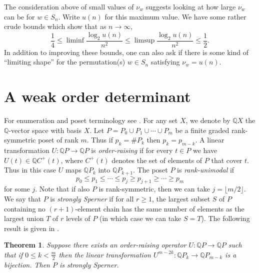 \documentclass[12pt]{amsart}
\newtheorem{thm}{Theorem}[section]
\theoremstyle{definition}
\theoremstyle{remark}
\numberwithin{equation}{section}
\begin{document}
The consideration above of small values of $\nu_w$ suggests looking at
how large $\nu_w$ can be for $w\in S_n$. Write $u(n)$ for this maximum
value. We have some rather crude bounds
which show that as $n\to\infty$,
 $$ \frac 14\leq\liminf \frac{\log_2 u(n)}{n^2}\leq 
   \limsup \frac{\log_2 u(n)}{n^2}\leq \frac 12. $$
In addition to improving these bounds, one can also ask if there is
some kind of ``limiting shape'' for the permutation(s) $w\in S_n$
satisfying $\nu_w=u(n)$.

\section{A weak order determinant}
For enumeration and poset terminology see \cite{ec1}. For any set $X$,
we denote by ${\mathbb{Q}} X$ the ${\mathbb{Q}}$-vector space with basis $X$. Let
$P=P_0\cup P_1\cup\cdots \cup P_m$ be a finite
graded rank-symmetric poset of rank $m$. Thus if $p_k=\#P_k$ then
$p_k=p_{m-k}$. A linear transformation $U\colon {\mathbb{Q}} P\to {\mathbb{Q}} P$ is
\emph{order-raising} if for every $t\in P$ we have $U(t)\in {\mathbb{Q}}
C^+(t)$, where $C^+(t)$ denotes the set of elements of $P$ that cover
$t$. Thus in this case
$U$ maps ${\mathbb{Q}} P_k$ into ${\mathbb{Q}} P_{k+1}$. The poset $P$ is
\emph{rank-unimodal} if
  $$ p_0\leq p_1\leq\cdots\leq p_j\geq p_{j+1}\geq\cdots\geq p_m $$
for some $j$. Note that if also $P$ is rank-symmetric, then we can
take $j=\lfloor m/2\rfloor$. We say that $P$ is \emph{strongly
  Sperner} if for all $r\geq 1$, the largest subset $S$ of $P$
containing no $(r+1)$-element chain has the same number of elements as
the largest union $T$ of $r$ levels of $P$ (in which case we can take
$S=T$). The following result is given in \cite[Lemma~1.1]{rs:hl}.

\begin{thm} \label{thm:sperner}
Suppose there exists an order-raising operator
$U\colon {\mathbb{Q}} P\to {\mathbb{Q}} P$ such that if $0\leq k<\frac m2$
then the linear transformation $U^{m-2k}\colon {\mathbb{Q}} P_k\to {\mathbb{Q}} P_{m-k}$
is a bijection. Then $P$ is strongly Sperner.
\end{thm}
\end{document}
